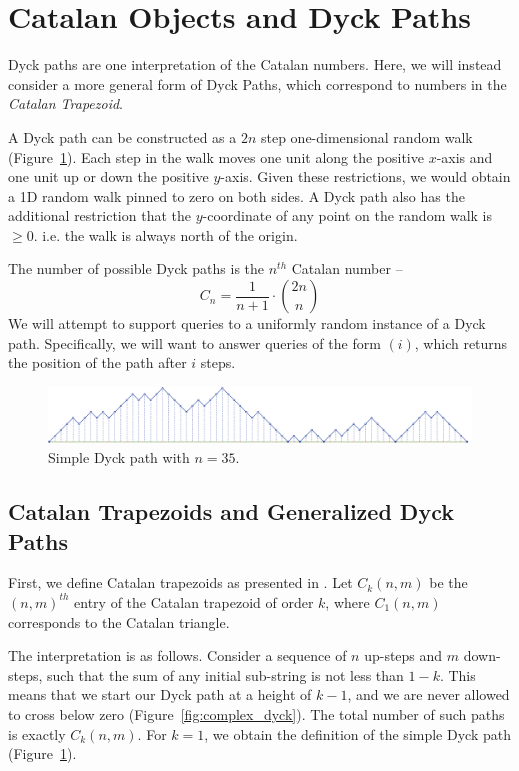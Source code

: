 \section{Catalan Objects and Dyck Paths}%
\label{sec:catalan_objects}

Dyck paths are one interpretation of the Catalan numbers.
Here, we will instead consider a more general form of Dyck Paths, which correspond to numbers in the \textit{Catalan Trapezoid}.

A Dyck path can be constructed as a $2n$ step one-dimensional random walk (Figure~\ref{fig:basic_dyck}).
Each step in the walk moves one unit along the positive $x$-axis and one unit up or down the positive $y$-axis.
Given these restrictions, we would obtain a 1D random walk pinned to zero  on both sides.
A Dyck path also has the additional restriction that the $y$-coordinate of any point on the random walk is $\ge 0$.
i.e. the walk is always north of the origin.

The number of possible Dyck paths is the $n^{th}$ Catalan number --
$$C_n = \frac{1}{n+1}\cdot {2n\choose n}$$
We will attempt to support queries to a uniformly random instance of a Dyck path.
Specifically, we will want to answer queries of the form $(i)$, which returns the position of the path after $i$ steps.

\begin{figure}[htbp]
    \centering
    \includegraphics[width=\textwidth]{dyck/basic_dyck_path.pdf}
    \caption{Simple Dyck path with $n = 35$.}
    \label{fig:basic_dyck}
\end{figure}


\subsection{Catalan Trapezoids and Generalized Dyck Paths}
First, we define Catalan trapezoids as presented in \cite{trap}.
Let $C_k(n,m)$ be the $(n,m)^{th}$ entry of the Catalan trapezoid of order $k$,
where $C_1(n,m)$ corresponds to the Catalan triangle.

The interpretation is as follows. Consider a sequence of $n$ up-steps and $m$ down-steps,
such that the sum of any initial sub-string is not less than $1-k$.
This means that we start our Dyck path at a height of $k-1$,
and we are never allowed to cross below zero (Figure~\ref{fig:complex_dyck}).
The total number of such paths is exactly $C_k(n,m)$.
For $k = 1$, we obtain the definition of the simple Dyck path (Figure~\ref{fig:basic_dyck}).

